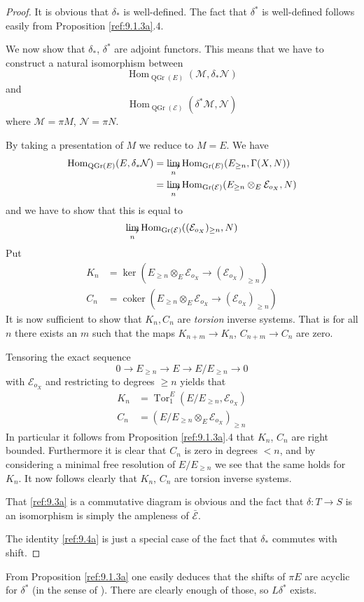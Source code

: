 \documentclass{amsproc}
\def\Escr{{\mathcal E}}
\def\Mscr{{\mathcal M}}
\def\Nscr{{\mathcal N}}
\def\Gr{\mathop{\text{Gr}}}
\def\Hom{\operatorname {Hom}}
\def\coker{\operatorname {coker}}
\def\ker{\operatorname {ker}}
\def\Tor{\operatorname {Tor}}
\def\r{\rightarrow}
\let\oldtext\text
\def\text#1{\oldtext{\upshape #1}}
\DeclareMathOperator{\QGr}{QGr}
\theoremstyle{definition}
\theoremstyle{remark}
\def\dirlim{\mathop{\vtop{\baselineskip -100pt\lineskip -1pt\lineskiplimit 0pt
\setbox0\hbox{\upshape lim}\copy0\hbox to \wd0{\rightarrowfill}}}\limits}
\numberwithin{equation}{section}
\numberwithin{table}{section}
\numberwithin{figure}{section}
\def\Gr{\mathop{\text{Gr}}}
\begin{document}
\begin{proof}
It is obvious that $\delta_\ast$ is well-defined. The fact that
$\delta^\ast$ is well-defined follows easily from Proposition
\ref{ref:9.1.3a}.4.

We now show that $\delta_\ast$, $\delta^\ast$ are adjoint functors. This
means that we have to construct a natural isomorphism between
\[
\Hom_{\QGr(E)}(\Mscr,\delta_\ast\Nscr)
\]
and
\[
\Hom_{\QGr(\Escr)}(\delta^\ast\Mscr,\Nscr)
\]
where $\Mscr=\pi M$, $\Nscr=\pi N$.  

By taking a presentation of $M$ we reduce to $M=E$. We have 
\begin{align*}
\Hom_{\QGr(E)}(E,\delta_\ast \Nscr)&=\dirlim_n \Hom_{\Gr(E)}
(E_{\ge n}, \Gamma(X,N))\\
&=\dirlim_n \Hom_{\Gr(\Escr)}(E_{\ge n}\otimes_E \Escr_{o_X},N)
\end{align*}
and we have to show that this is equal to 
\[
\dirlim_{n}\Hom_{\Gr(\Escr)}((\Escr_{o_X})_{\ge n},N)
\]
Put 
\begin{align*}
K_n&=\ker (E_{\ge n}\otimes_E \Escr_{o_X}\r (\Escr_{o_X})_{\ge n})\\
C_n&=\coker (E_{\ge n}\otimes_E \Escr_{o_X}\r (\Escr_{o_X})_{\ge n})
\end{align*}
It is now sufficient to show that $K_n,C_n$ are \emph{torsion} inverse
systems. That is for all $n$ there exists an $m$ such that the maps
$K_{n+m}\r K_n$, $C_{n+m}\r C_n$ are zero.

Tensoring the exact sequence 
\[
0\r E_{\ge n}\r E\r E/E_{\ge n}
\r 0
\]
with $\Escr_{o_X}$ and restricting to degrees $\ge n$ yields that 
\begin{align*}
K_n&=\Tor_1^E(E/E_{\ge n}, \Escr_{o_X})\\
C_n&=(E/E_{\ge n}\otimes_E \Escr_{o_X})_{\ge n}
\end{align*}
In particular it follows from Proposition \ref{ref:9.1.3a}.4 that $K_n$, $C_n$
are right bounded. Furthermore it is clear that $C_n$ is zero in degrees
$< n$, and by considering a minimal free resolution of $E/E_{\ge n}$ we
see that the same holds for $K_n$. It now follows clearly that $K_n$,
$C_n$ are torsion inverse systems.


That \eqref{ref:9.3a} is a commutative diagram is obvious and the fact
that $\delta:T\r S$ is an isomorphism is simply the ampleness of $\bar{\Escr}$.

The identity \eqref{ref:9.4a} is just a special case of the fact that
$\delta_\ast$ commutes with shift.
\end{proof}
From Proposition \ref{ref:9.1.3a} one easily deduces that the
shifts of $\pi E$ are acyclic for $\delta^\ast$ (in the sense of
\cite{RD}). There are clearly enough of those, so $L\delta^\ast$
exists.
\end{document}
